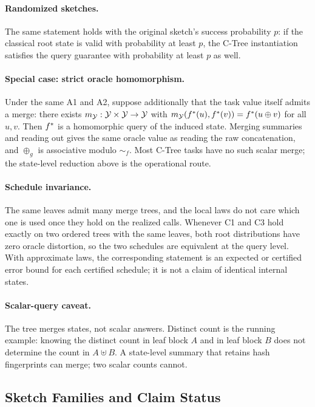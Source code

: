 \paragraph{Randomized sketches.}
The same statement holds with the original sketch's success
probability \(p\): if the classical root state is valid with
probability at least \(p\), the C-Tree instantiation satisfies the
query guarantee with probability at least \(p\) as well.

\paragraph{Special case: strict oracle homomorphism.}
Under the same A1 and A2, suppose additionally that the task value
itself admits a merge: there exists
\(m_{\mathcal{Y}}:\mathcal{Y}\times\mathcal{Y}\to\mathcal{Y}\) with
\(m_{\mathcal{Y}}(f^\ast(u),f^\ast(v))=f^\ast(u\oplus v)\) for all \(u,v\).
Then \(f^\ast\) is a homomorphic query of the induced state.
Merging summaries and reading out gives the same oracle value as
reading the raw concatenation, and \(\oplus_g\) is associative
modulo \(\sim_f\). Most C-Tree tasks have no such scalar merge; the
state-level reduction above is the operational route.

\paragraph{Schedule invariance.}
The same leaves admit many merge trees, and the local laws do not
care which one is used once they hold on the realized calls. Whenever
C1 and C3 hold exactly on two ordered trees with the same leaves, both
root distributions have zero oracle distortion, so the two schedules
are equivalent at the query level. With approximate laws, the
corresponding statement is an expected or certified error bound for
each certified schedule; it is not a claim of identical internal
states.

\paragraph{Scalar-query caveat.}
The tree merges states, not scalar answers. Distinct count is the
running example: knowing the distinct count in leaf block \(A\) and in
leaf block \(B\) does not determine the count in \(A\uplus B\). A
state-level summary that retains hash fingerprints can merge; two
scalar counts cannot.

\subsection{Sketch Families and Claim Status}
\label{sec:v7-sketch-inventory}

